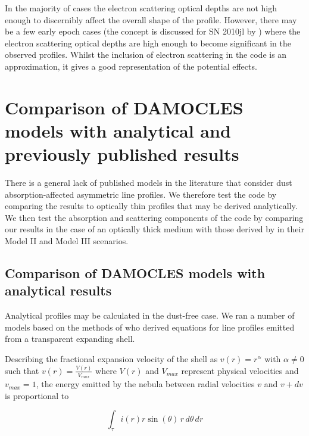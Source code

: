 \documentclass[useAMS,usenatbib,usegraphicx]{mnras}
\begin{document}
In the majority of cases the electron scattering optical depths are not high 
enough to discernibly affect the overall shape of the profile.  However, 
there may be a few early epoch cases (the concept is discussed for SN 2010jl 
by \citet{Fransson2013}) where the electron scattering optical depths are high enough to 
become significant in the observed profiles.  Whilst the inclusion of 
electron scattering in the code is an approximation, it gives a good 
representation of the potential effects.




\section{Comparison of DAMOCLES models with analytical and previously published results}
\label{params}

There is a general lack of published models in the literature that 
consider dust absorption-affected asymmetric line profiles.  We therefore test 
the code by comparing the results to optically thin profiles that may be 
derived analytically.  We then test the absorption and scattering 
components of the code by comparing our results in the case of an 
optically thick medium with those derived by \citet{Lucy1989} in their 
Model II and Model III scenarios.

\subsection{Comparison of DAMOCLES models with analytical results}
\label{analytics}

Analytical profiles may be calculated in the dust-free case.  We ran a 
number of models based on the methods of \cite{Gerasimovic1933} 
who derived equations for line profiles emitted from a transparent 
expanding shell.

Describing the fractional expansion velocity of the shell as $v(r)=r^\alpha$ with 
$\alpha \neq 0$ such that $v(r)=\frac{V(r)}{V_{max}}$ where $V(r)$ and $V_{max}$ represent physical velocities and $v_{max}=1$, the energy emitted by 
the nebula between radial velocities $v$ and $v+dv$ is proportional to

\begin{equation}
\int _\tau i(r) r \sin (\theta) \, r \, d\theta \, dr
\end{equation}
\end{document}
